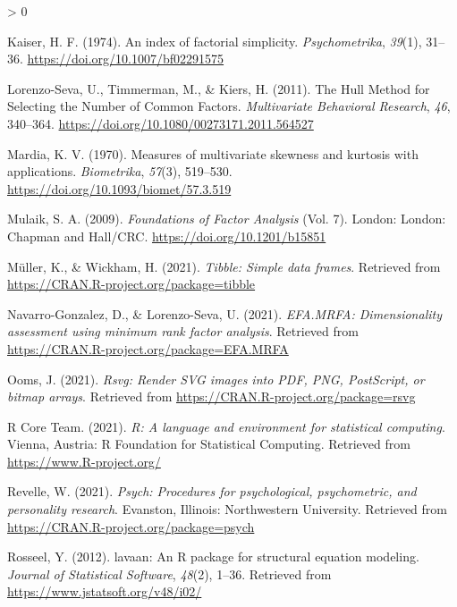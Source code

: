 \documentclass[
  english,
  man]{apa6}
\newlength{\cslhangindent}
\newenvironment{CSLReferences}[2] %
 {%
  \setlength{\parindent}{0pt}
  \ifodd #1 \everypar{\setlength{\hangindent}{\cslhangindent}}\ignorespaces\fi
  \ifnum #2 > 0
  \setlength{\parskip}{#2\baselineskip}
  \fi
 }%
 {}
\begin{document}
\begin{CSLReferences}{1}{0}
\leavevmode\hypertarget{ref-kaiserIndexFactorialSimplicity1974}{}%
Kaiser, H. F. (1974). An index of factorial simplicity. \emph{Psychometrika}, \emph{39}(1), 31--36. \url{https://doi.org/10.1007/bf02291575}

\leavevmode\hypertarget{ref-lorenzo-sevaHullMethodSelecting2011}{}%
Lorenzo-Seva, U., Timmerman, M., \& Kiers, H. (2011). The {Hull Method} for {Selecting} the {Number} of {Common Factors}. \emph{Multivariate Behavioral Research}, \emph{46}, 340--364. \url{https://doi.org/10.1080/00273171.2011.564527}

\leavevmode\hypertarget{ref-mardiaMeasuresMultivariateSkewness1970}{}%
Mardia, K. V. (1970). Measures of multivariate skewness and kurtosis with applications. \emph{Biometrika}, \emph{57}(3), 519--530. \url{https://doi.org/10.1093/biomet/57.3.519}

\leavevmode\hypertarget{ref-mulaikFoundationsFactorAnalysis2009}{}%
Mulaik, S. A. (2009). \emph{Foundations of {Factor Analysis}} (Vol. 7). {London}: {London: Chapman and Hall/CRC}. \url{https://doi.org/10.1201/b15851}

\leavevmode\hypertarget{ref-R-tibble}{}%
Müller, K., \& Wickham, H. (2021). \emph{Tibble: Simple data frames}. Retrieved from \url{https://CRAN.R-project.org/package=tibble}

\leavevmode\hypertarget{ref-R-EFA.MRFA}{}%
Navarro-Gonzalez, D., \& Lorenzo-Seva, U. (2021). \emph{EFA.MRFA: Dimensionality assessment using minimum rank factor analysis}. Retrieved from \url{https://CRAN.R-project.org/package=EFA.MRFA}

\leavevmode\hypertarget{ref-R-rsvg}{}%
Ooms, J. (2021). \emph{Rsvg: Render SVG images into PDF, PNG, PostScript, or bitmap arrays}. Retrieved from \url{https://CRAN.R-project.org/package=rsvg}

\leavevmode\hypertarget{ref-R-base}{}%
R Core Team. (2021). \emph{R: A language and environment for statistical computing}. Vienna, Austria: R Foundation for Statistical Computing. Retrieved from \url{https://www.R-project.org/}

\leavevmode\hypertarget{ref-R-psych}{}%
Revelle, W. (2021). \emph{Psych: Procedures for psychological, psychometric, and personality research}. Evanston, Illinois: Northwestern University. Retrieved from \url{https://CRAN.R-project.org/package=psych}

\leavevmode\hypertarget{ref-R-lavaan}{}%
Rosseel, Y. (2012). {lavaan}: An {R} package for structural equation modeling. \emph{Journal of Statistical Software}, \emph{48}(2), 1--36. Retrieved from \url{https://www.jstatsoft.org/v48/i02/}


\end{CSLReferences}
\end{document}
